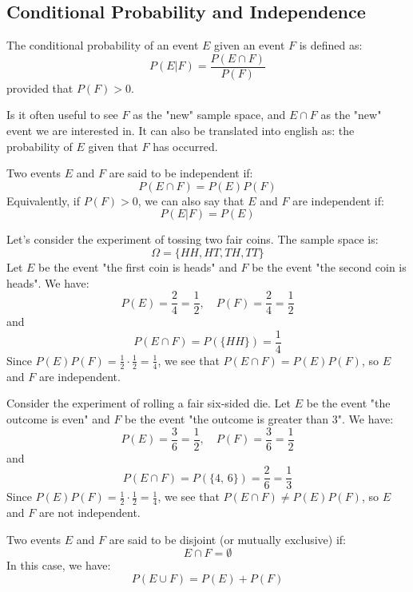 \subsection{Conditional Probability and Independence}
\begin{definition}
    The conditional probability of an event $E$ given an event $F$ is defined as:
    \[
        P(E|F) = \frac{P(E \cap F)}{P(F)}
    \]
    provided that $P(F) > 0$.
\end{definition}
Is it often useful to see $F$ as the "new" sample space, and $E \cap F$ as the "new" event we are interested in. It can also be translated into english as: the probability of $E$ given that $F$ has occurred.

\begin{definition}[Independence]
    Two events $E$ and $F$ are said to be independent if:
    \[
        P(E \cap F) = P(E)P(F)
    \]
    Equivalently, if $P(F) > 0$, we can also say that $E$ and $F$ are independent if:
    \[
        P(E|F) = P(E)
    \]
\end{definition}

\begin{eg}
    Let's consider the experiment of tossing two fair coins. The sample space is:
    \[
        \Omega = \{HH, HT, TH, TT\}
    \]
    Let $E$ be the event "the first coin is heads" and $F$ be the event "the second coin is heads". We have:
    \[
        P(E) = \frac{2}{4} = \frac{1}{2}, \quad P(F) = \frac{2}{4} = \frac{1}{2}
    \]
    and
    \[
        P(E \cap F) = P(\{HH\}) = \frac{1}{4}
    \]
    Since $P(E)P(F) = \frac{1}{2} \cdot \frac{1}{2} = \frac{1}{4}$, we see that $P(E \cap F) = P(E)P(F)$, so $E$ and $F$ are independent.
\end{eg}

\begin{eg}
    Consider the experiment of rolling a fair six-sided die. Let $E$ be the event "the outcome is even" and $F$ be the event "the outcome is greater than 3". We have:
    \[
        P(E) = \frac{3}{6} = \frac{1}{2}, \quad P(F) = \frac{3}{6} = \frac{1}{2}
    \]
    and
    \[
        P(E \cap F) = P(\{\text{4, 6}\}) = \frac{2}{6} = \frac{1}{3}
    \]
    Since $P(E)P(F) = \frac{1}{2} \cdot \frac{1}{2} = \frac{1}{4}$, we see that $P(E \cap F) \neq P(E)P(F)$, so $E$ and $F$ are not independent.
\end{eg}

\begin{definition}
    Two events $E$ and $F$ are said to be disjoint (or mutually exclusive) if:
    \[
        E \cap F = \emptyset
    \]
    In this case, we have:
    \[
        P(E \cup F) = P(E) + P(F)
    \]
\end{definition}

